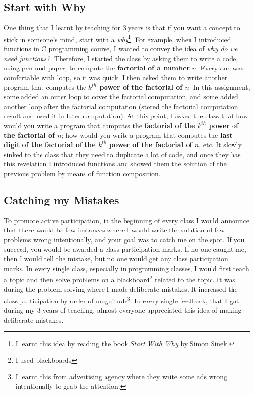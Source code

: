 \documentclass[a4paper]{article}
\begin{document}
\subsection{Start with Why}
One thing that I learnt by teaching for 3 years is that if you want a concept 
to stick in someone's mind, start with a \textit{why}\footnote{I learnt this idea by reading the book 
\textit{Start With Why} by Simon Sinek.}. For example, when I introduced functions 
in C programming course, I wanted to convey the idea of \textit{why do we need functions?}. Therefore, I started the class by 
asking them to write a code, using pen and paper, to compute the \textbf{factorial of a number $n$}. 
Every one was comfortable with loop, so it was quick. I then asked them to write 
another program that computes the \textbf{$k^{th}$ power of the factorial of $n$}. 
In this assignment, some added an outer loop to cover the factorial computation, 
and some added another loop after the factorial computation (stored the factorial 
computation result and used it in later computation). 
At this point, I asked the class 
that how would you write a program that computes the \textbf{factorial of 
the $k^{th}$ power of the factorial of $n$}; how would you write a program 
that computes the \textbf{last digit of 
the factorial of the $k^{th}$ power of the factorial of $n$}, etc. It slowly 
sinked to the class that they need to duplicate a lot of code, and once 
they has this revelation I introduced functions 
and showed them the solution of the previous problem by means of function composition.

\subsection{Catching my Mistakes}
To promote active participation, in the beginning of every class 
I would announce that there would be 
few instances where I would write the solution of few problems wrong intentionally, 
and your goal was to catch me on the spot. If you succeed, you would be awarded 
a class participation marks. If no one caught me, 
then I would tell the mistake, but no one would get any 
class participation marks. In every single class, especially in programming classes, 
I would first teach a topic and then solve problems on 
a blackboard\footnote{I used blackboards} related to the topic. 
It was during the problem solving where I made deliberate mistakes.
It increased the class participation by order of 
magnitude\footnote{I learnt this 
from advertising agency where they write some ads wrong 
intentionally to grab the attention.}. In every single 
feedback, that I got during my 3 years of teaching, 
almost everyone appreciated this idea of making deliberate mistakes. 
\end{document}
